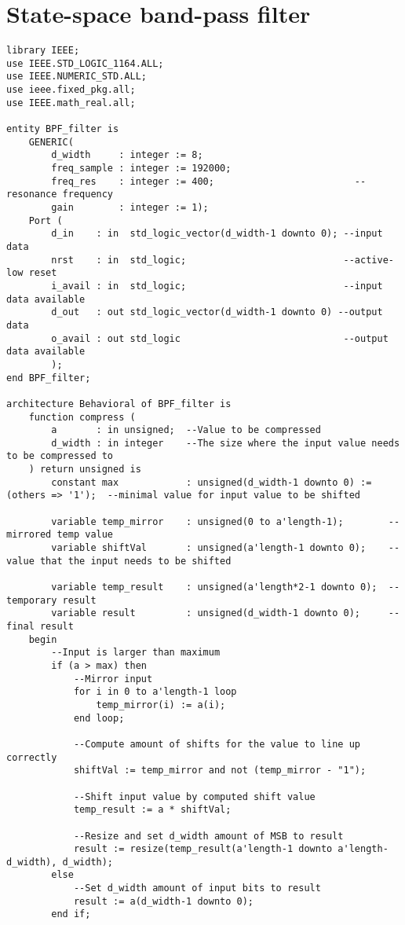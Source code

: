 \section*{State-space band-pass filter}
\begin{lstlisting}
library IEEE;
use IEEE.STD_LOGIC_1164.ALL;
use IEEE.NUMERIC_STD.ALL;
use ieee.fixed_pkg.all;
use IEEE.math_real.all;

entity BPF_filter is
    GENERIC(
        d_width     : integer := 8;
        freq_sample : integer := 192000;
        freq_res    : integer := 400;                         --resonance frequency
        gain        : integer := 1);
    Port ( 
        d_in    : in  std_logic_vector(d_width-1 downto 0); --input data
        nrst    : in  std_logic;                            --active-low reset
        i_avail : in  std_logic;                            --input data available
        d_out   : out std_logic_vector(d_width-1 downto 0) --output data
        o_avail : out std_logic                             --output data available
        ); 
end BPF_filter;

architecture Behavioral of BPF_filter is
    function compress (
        a       : in unsigned;  --Value to be compressed
        d_width : in integer    --The size where the input value needs to be compressed to
    ) return unsigned is
        constant max            : unsigned(d_width-1 downto 0) := (others => '1');  --minimal value for input value to be shifted

        variable temp_mirror    : unsigned(0 to a'length-1);        --mirrored temp value
        variable shiftVal       : unsigned(a'length-1 downto 0);    --value that the input needs to be shifted

        variable temp_result    : unsigned(a'length*2-1 downto 0);  --temporary result
        variable result         : unsigned(d_width-1 downto 0);     --final result
    begin
        --Input is larger than maximum 
        if (a > max) then
            --Mirror input
            for i in 0 to a'length-1 loop
                temp_mirror(i) := a(i);
            end loop;

            --Compute amount of shifts for the value to line up correctly
            shiftVal := temp_mirror and not (temp_mirror - "1");

            --Shift input value by computed shift value
            temp_result := a * shiftVal;

            --Resize and set d_width amount of MSB to result
            result := resize(temp_result(a'length-1 downto a'length-d_width), d_width);
        else
            --Set d_width amount of input bits to result
            result := a(d_width-1 downto 0);
        end if;


\end{lstlisting}
